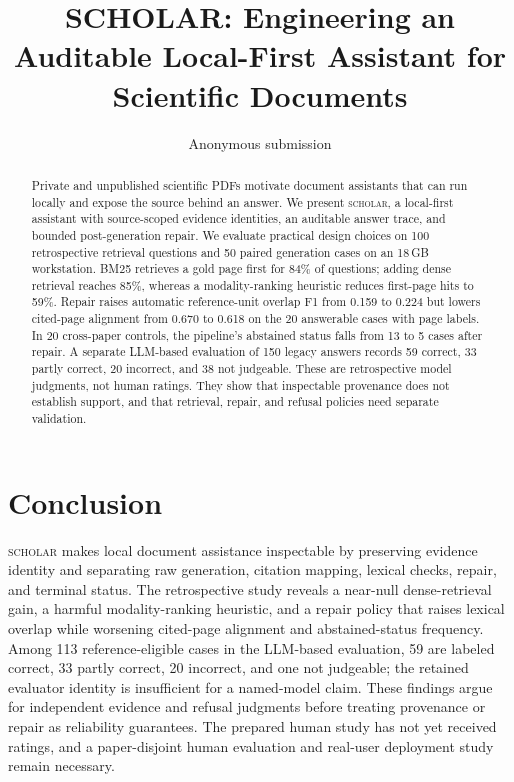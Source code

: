 \documentclass[11pt]{article}
\title{SCHOLAR: Engineering an Auditable Local-First Assistant for Scientific Documents}
\author{Anonymous submission}
\begin{document}
\maketitle
\begin{abstract}
Private and unpublished scientific PDFs motivate document assistants that can run locally and expose the source behind an answer. We present \textsc{scholar}, a local-first assistant with source-scoped evidence identities, an auditable answer trace, and bounded post-generation repair. We evaluate practical design choices on 100 retrospective retrieval questions and 50 paired generation cases on an 18\,GB workstation. BM25 retrieves a gold page first for 84\% of questions; adding dense retrieval reaches 85\%, whereas a modality-ranking heuristic reduces first-page hits to 59\%. Repair raises automatic reference-unit overlap F1 from 0.159 to 0.224 but lowers cited-page alignment from 0.670 to 0.618 on the 20 answerable cases with page labels. In 20 cross-paper controls, the pipeline's abstained status falls from 13 to 5 cases after repair. A separate LLM-based evaluation of 150 legacy answers records 59 correct, 33 partly correct, 20 incorrect, and 38 not judgeable. These are retrospective model judgments, not human ratings. They show that inspectable provenance does not establish support, and that retrieval, repair, and refusal policies need separate validation.
\end{abstract}









\section{Conclusion}
\textsc{scholar} makes local document assistance inspectable by preserving evidence identity and separating raw generation, citation mapping, lexical checks, repair, and terminal status. The retrospective study reveals a near-null dense-retrieval gain, a harmful modality-ranking heuristic, and a repair policy that raises lexical overlap while worsening cited-page alignment and abstained-status frequency. Among 113 reference-eligible cases in the LLM-based evaluation, 59 are labeled correct, 33 partly correct, 20 incorrect, and one not judgeable; the retained evaluator identity is insufficient for a named-model claim. These findings argue for independent evidence and refusal judgments before treating provenance or repair as reliability guarantees. The prepared human study has not yet received ratings, and a paper-disjoint human evaluation and real-user deployment study remain necessary.
\label{content:end}






\clearpage
\appendix

\end{document}
